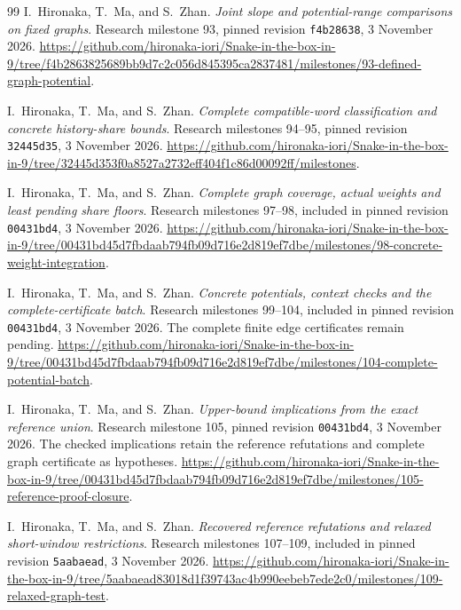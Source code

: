 \documentclass[11pt,a4paper]{article}
\theoremstyle{definition}
\theoremstyle{remark}
\begin{document}
\begin{thebibliography}{99}
I.~Hironaka, T.~Ma, and S.~Zhan. \emph{Joint slope and potential-range comparisons on fixed graphs}. Research milestone 93, pinned revision \texttt{f4b28638}, 3 November 2026.
\url{https://github.com/hironaka-iori/Snake-in-the-box-in-9/tree/f4b2863825689bb9d7c2c056d845395ca2837481/milestones/93-defined-graph-potential}.

I.~Hironaka, T.~Ma, and S.~Zhan. \emph{Complete compatible-word classification and concrete history-share bounds}. Research milestones 94--95, pinned revision \texttt{32445d35}, 3 November 2026.
\url{https://github.com/hironaka-iori/Snake-in-the-box-in-9/tree/32445d353f0a8527a2732eff404f1c86d00092ff/milestones}.

I.~Hironaka, T.~Ma, and S.~Zhan. \emph{Complete graph coverage, actual weights and least pending share floors}. Research milestones 97--98, included in pinned revision \texttt{00431bd4}, 3 November 2026.
\url{https://github.com/hironaka-iori/Snake-in-the-box-in-9/tree/00431bd45d7fbdaab794fb09d716e2d819ef7dbe/milestones/98-concrete-weight-integration}.

I.~Hironaka, T.~Ma, and S.~Zhan. \emph{Concrete potentials, context checks and the complete-certificate batch}. Research milestones 99--104, included in pinned revision \texttt{00431bd4}, 3 November 2026. The complete finite edge certificates remain pending.
\url{https://github.com/hironaka-iori/Snake-in-the-box-in-9/tree/00431bd45d7fbdaab794fb09d716e2d819ef7dbe/milestones/104-complete-potential-batch}.

I.~Hironaka, T.~Ma, and S.~Zhan. \emph{Upper-bound implications from the exact reference union}. Research milestone 105, pinned revision \texttt{00431bd4}, 3 November 2026. The checked implications retain the reference refutations and complete graph certificate as hypotheses.
\url{https://github.com/hironaka-iori/Snake-in-the-box-in-9/tree/00431bd45d7fbdaab794fb09d716e2d819ef7dbe/milestones/105-reference-proof-closure}.

I.~Hironaka, T.~Ma, and S.~Zhan. \emph{Recovered reference refutations and relaxed short-window restrictions}. Research milestones 107--109, included in pinned revision \texttt{5aabaead}, 3 November 2026.
\url{https://github.com/hironaka-iori/Snake-in-the-box-in-9/tree/5aabaead83018d1f39743ac4b990eebeb7ede2c0/milestones/109-relaxed-graph-test}.


\end{thebibliography}
\end{document}
